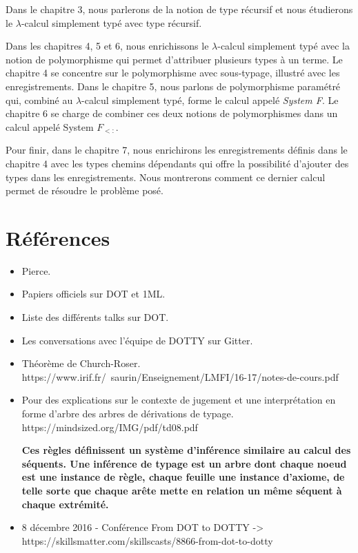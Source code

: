 Dans le chapitre 3, nous parlerons de la notion de type récursif et nous
étudierons le $\lambda$-calcul simplement typé avec type récursif.

Dans les chapitres 4, 5 et 6, nous enrichissons le $\lambda$-calcul simplement
typé avec la notion de polymorphisme qui permet d'attribuer plusieurs types à un
terme. Le chapitre 4 se concentre sur le polymorphisme avec sous-typage,
illustré avec les enregistrements. Dans le chapitre 5, nous parlons de
polymorphisme paramétré qui, combiné au $\lambda$-calcul simplement typé, forme
le calcul appelé \textit{System F}.
Le chapitre 6 se charge de combiner ces deux notions de polymorphismes dans un
calcul appelé System $F_{<:}$.

Pour finir, dans le chapitre 7, nous enrichirons les enregistrements définis
dans le chapitre 4 avec les types chemins dépendants qui offre la possibilité
d'ajouter des types dans les enregistrements. Nous montrerons comment ce dernier
calcul permet de résoudre le problème posé.

\section{Références}

\begin{itemize}
  \item Pierce.
  \item Papiers officiels sur DOT et 1ML.
  \item Liste des différents talks sur DOT.
  \item Les conversations avec l'équipe de DOTTY sur Gitter.
  \item Théorème de Church-Roser. https://www.irif.fr/~saurin/Enseignement/LMFI/16-17/notes-de-cours.pdf
\end{itemize}

\begin{itemize}
  \item Pour des explications sur le contexte de jugement et une interprétation en
  forme d'arbre des arbres de dérivations de typage.
  https://mindsized.org/IMG/pdf/td08.pdf

  \textbf{Ces règles définissent un système d’inférence
similaire au calcul des séquents. Une inférence
de typage est un arbre dont chaque noeud est
une instance de règle, chaque feuille une instance
d’axiome, de telle sorte que chaque arête mette en
relation un même séquent à chaque extrémité.}

  \item 8 décembre 2016 - Conférence From DOT to DOTTY -> https://skillsmatter.com/skillscasts/8866-from-dot-to-dotty
\end{itemize}